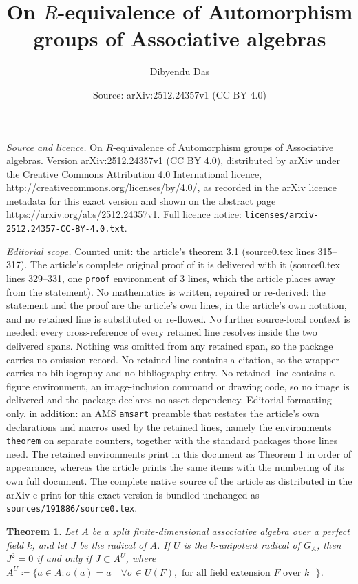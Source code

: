 \documentclass[10pt,a4paper]{amsart}
\title{On $R$-equivalence of Automorphism groups of Associative algebras}
\author{Dibyendu Das}
\date{Source: arXiv:2512.24357v1 (CC BY 4.0)}
\newtheorem{theorem}{Theorem}
\begin{document}
\maketitle

\noindent\emph{Source and licence.} On $R$-equivalence of Automorphism groups of Associative algebras. Version arXiv:2512.24357v1 (CC BY 4.0), distributed by arXiv under the Creative Commons Attribution 4.0 International licence, http://creativecommons.org/licenses/by/4.0/, as recorded in the arXiv licence metadata for this exact version and shown on the abstract page https://arxiv.org/abs/2512.24357v1. Full licence notice: \texttt{licenses/arxiv-2512.24357-CC-BY-4.0.txt}.\par\smallskip

\noindent\textit{Editorial scope.} Counted unit: the article's theorem 3.1 (source0.tex lines 315--317). The article's complete original proof of it is delivered with it (source0.tex lines 329--331, one \texttt{proof} environment of 3 lines, which the article places away from the statement). No mathematics is written, repaired or re-derived: the statement and the proof are the article's own lines, in the article's own notation, and no retained line is substituted or re-flowed.  No further source-local context is needed: every cross-reference of every retained line resolves inside the two delivered spans.  Nothing was omitted from any retained span, so the package carries no omission record.  No retained line contains a citation, so the wrapper carries no bibliography and no bibliography entry.  No retained line contains a figure environment, an image-inclusion command or drawing code, so no image is delivered and the package declares no asset dependency.  Editorial formatting only, in addition: an AMS \texttt{amsart} preamble that restates the article's own declarations and macros used by the retained lines, namely the environments \texttt{theorem} on separate counters, together with the standard packages those lines need.  The retained environments print in this document as Theorem 1 in order of appearance, whereas the article prints the same items with the numbering of its own full document.  The complete native source of the article as distributed in the arXiv e-print for this exact version is bundled unchanged as \texttt{sources/191886/source0.tex}.
\begin{theorem}\label{Theorem 3.1}
Let $A$ be a split finite-dimensional associative algebra over a perfect field $k$, and let $J$ be the radical of $A$. If $U$ is the $k$-unipotent radical of $G_A$, then $J^2=0$ if and only if $J\subset A^{U}$, where $A^U\coloneq \{a\in A:\sigma(a)=a \quad \forall \sigma\in U(F), \text{ for all field extension $F$ over $k$ } \}$. 
\end{theorem}
\end{document}
